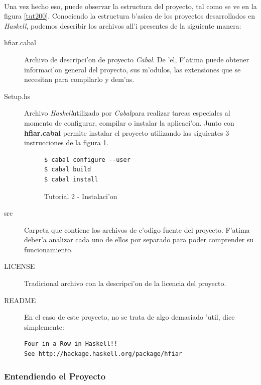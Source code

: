 \documentclass[a4paper]{article}
\newcommand{\haskell}{\textsl{Haskell}}
\newcommand{\cabal}{\textsl{Cabal}}
\begin{document}
\paragraph{}Una vez hecho eso, puede observar la estructura del proyecto, tal como se ve en la figura \ref{tut200}.  Conociendo la estructura b'asica de los proyectos desarrollados en \haskell, podemos describir los archivos all'i presentes de la siguiente manera:
\begin{description}
\item[hfiar.cabal] Archivo de descripci'on de proyecto \cabal.  De 'el, F'atima puede obtener informaci'on general del proyecto, sus m'odulos, las extensiones que se necesitan para compilarlo y dem'as.  
\lstset{language=haskell, frame=single, tabsize=4}
\item[Setup.hs] Archivo \haskell utilizado por \cabal para realizar tareas especiales al momento de configurar, compilar o instalar la aplicaci'on.  Junto con \textbf{hfiar.cabal} permite instalar el proyecto utilizando las siguientes 3 instrucciones de la figura \ref{tut201}.
\begin{figure}[hp]
	\begin{center}
		\begin{lstlisting}
$ cabal configure --user
$ cabal build
$ cabal install
		\end{lstlisting}
		\caption{Tutorial 2 - Instalaci'on}
		\label{tut201}
	\end{center}
\end{figure}
\item[src] Carpeta que contiene los archivos de c'odigo fuente del proyecto.  F'atima deber'a analizar cada uno de ellos por separado para poder comprender su funcionamiento.
\item[LICENSE] Tradicional archivo con la descripci'on de la licencia del proyecto.
\item[README] En el caso de este proyecto, no se trata de algo demasiado 'util, dice simplemente:
\begin{verbatim}
Four in a Row in Haskell!!
See http://hackage.haskell.org/package/hfiar
\end{verbatim}
\end{description}

\subsubsection{Entendiendo el Proyecto}
\end{document}
